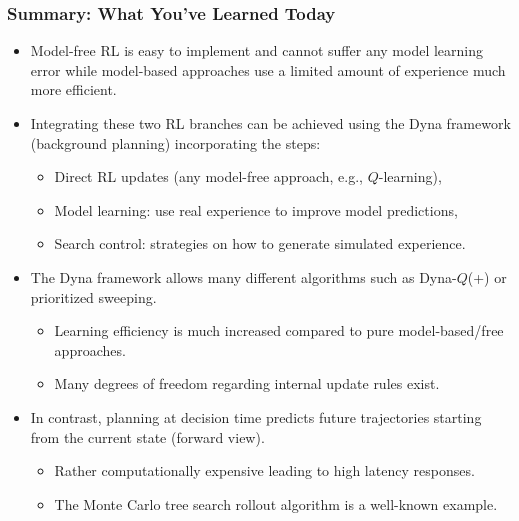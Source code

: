 \begin{frame}
\frametitle{Summary: What You've Learned Today}
\begin{itemize}
	\item Model-free RL is easy to implement and cannot suffer any model learning error while model-based approaches use a limited amount of experience much more efficient. \pause
	\item Integrating these two RL branches can be achieved using the Dyna framework (background planning) incorporating the steps:
	\begin{itemize}
		\item Direct RL updates (any model-free approach, e.g., $Q$-learning),
		\item Model learning: use real experience to improve model predictions,
		\item Search control: strategies on how to generate simulated experience. \pause
	\end{itemize}
	\item The Dyna framework allows many different algorithms such as Dyna-$Q$(+) or prioritized sweeping.
	\begin{itemize}
		\item Learning efficiency is much increased compared to pure model-based/free approaches.
		\item Many degrees of freedom regarding internal update rules exist.\pause 
	\end{itemize}
	\item In contrast, planning at decision time predicts future trajectories starting from the current state (forward view).
	\begin{itemize}
		\item Rather computationally expensive leading to high latency responses.
		\item The Monte Carlo tree search rollout algorithm is a well-known example.
	\end{itemize}
\end{itemize}
\end{frame}